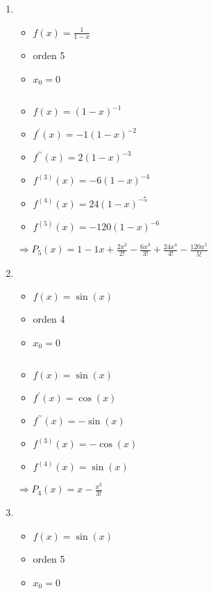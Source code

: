 \documentclass[../practica_05.tex]{subfiles}
\begin{document}
    \begin{enumerate}
        \item
            \begin{itemize}
                \item $f(x) = \frac{1}{1-x}$
                \item orden 5
                \item $x_0 = 0$
            \end{itemize}

            $ $

            \begin{itemize}
                \item $f(x) = (1-x)^{-1}$
                \item $f^\prime(x) = -1(1-x)^{-2}$
                \item $f^{\prime\prime}(x) = 2(1-x)^{-3}$
                \item $f^{(3)}(x) = -6(1-x)^{-4}$
                \item $f^{(4)}(x) = 24(1-x)^{-5}$
                \item $f^{(5)}(x) = -120(1-x)^{-6}$
            \end{itemize}

            $\Rightarrow P_5(x) = 1 - 1x + \frac{2x^2}{2!} - \frac{6x^3}{3!} + \frac{24x^4}{4!} - \frac{120x^5}{5!} $

        \item
            \begin{itemize}
                \item $f(x) = \sin(x)$
                \item orden 4
                \item $x_0 = 0$
            \end{itemize}

            $ $

            \begin{itemize}
                \item $f(x) = \sin(x)$
                \item $f^\prime(x) = \cos(x)$
                \item $f^{\prime\prime}(x) = -\sin(x)$
                \item $f^{(3)}(x) = -\cos(x)$
                \item $f^{(4)}(x) = \sin(x)$
            \end{itemize}

            $\Rightarrow P_4(x) = x - \frac{x^3}{3!}$
        \item
            \begin{itemize}
                \item $f(x) = \sin(x)$
                \item orden 5
                \item $x_0 = 0$
            \end{itemize}


\end{enumerate}
\end{document}
